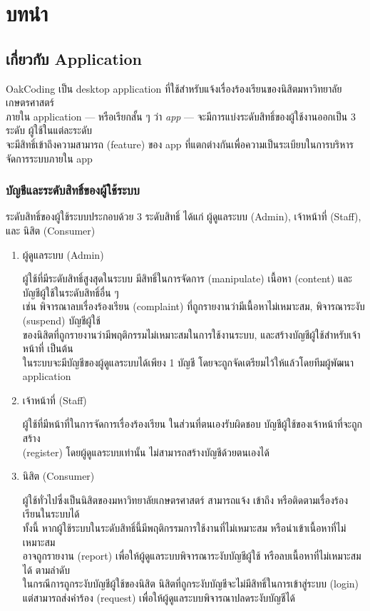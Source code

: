 \section*{บทนำ}

\subsection*{เกี่ยวกับ Application}

OakCoding เป็น desktop application ที่ใช้สำหรับแจ้งเรื่องร้องเรียนของนิสิตมหาวิทยาลัยเกษตรศาสตร์\\
ภายใน application --- หรือเรียกสั้น ๆ ว่า \textit{app} --- จะมีการแบ่งระดับสิทธิ์ของผู้ใช้งานออกเป็น 3 ระดับ ผู้ใช้ในแต่ละระดับ\\
จะมีสิทธิ์เข้าถึงความสามารถ (feature) ของ app ที่แตกต่างกันเพื่อความเป็นระเบียบในการบริหารจัดการระบบภายใน app

\subsubsection*{บัญชีและระดับสิทธิ์ของผู้ใช้ระบบ}
ระดับสิทธิ์ของผู้ใช้ระบบประกอบด้วย 3 ระดับสิทธิ์ ได้แก่ ผู้ดูแลระบบ (Admin), เจ้าหน้าที่ (Staff), และ นิสิต (Consumer)

\begin{enumerate}
    \item ผู้ดูแลระบบ (Admin)

        ผู้ใช้ที่มีระดับสิทธิ์สูงสุดในระบบ มีสิทธิ์ในการจัดการ (manipulate) เนื้อหา (content) และบัญชีผู้ใช้ในระดับสิทธิ์อื่น ๆ\\
        เช่น พิจารณาลบเรื่องร้องเรียน (complaint) ที่ถูกรายงานว่ามีเนื้อหาไม่เหมาะสม, พิจารณาระงับ (suspend) บัญชีผู้ใช้\\
        ของนิสิตที่ถูกรายงานว่ามีพฤติกรรมไม่เหมาะสมในการใช้งานระบบ, และสร้างบัญชีผู้ใช้สำหรับเจ้าหน้าที่ เป็นต้น\\
        ในระบบจะมีบัญชีของผู้ดูแลระบบได้เพียง 1 บัญชี โดยจะถูกจัดเตรียมไว้ให้แล้วโดยทีมผู้พัฒนา application
    \item เจ้าหน้าที่ (Staff)

        ผู้ใช้ที่มีหน้าที่ในการจัดการเรื่องร้องเรียน ในส่วนที่ตนเองรับผิดชอบ บัญชีผู้ใช้ของเจ้าหน้าที่จะถูกสร้าง\\
        (register) โดยผู้ดูแลระบบเท่านั้น ไม่สามารถสร้างบัญชีด้วยตนเองได้
    \item นิสิต (Consumer)

        ผู้ใช้ทั่วไปซึ่งเป็นนิสิตของมหาวิทยาลัยเกษตรศาสตร์ สามารถแจ้ง เข้าถึง หรือติดตามเรื่องร้องเรียนในระบบได้\\
        ทั้งนี้ หากผู้ใช้ระบบในระดับสิทธิ์นี้มีพฤติกรรมการใช้งานที่ไม่เหมาะสม หรือนำเข้าเนื้อหาที่ไม่เหมาะสม\\
        อาจถูกรายงาน (report) เพื่อให้ผู้ดูแลระบบพิจารณาระงับบัญชีผู้ใช้ หรือลบเนื้อหาที่ไม่เหมาะสมได้ ตามลำดับ\\
        ในกรณีการถูกระงับบัญชีผู้ใช้ของนิสิต นิสิตที่ถูกระงับบัญชีจะไม่มีสิทธิ์ในการเข้าสู่ระบบ (login)\\
        แต่สามารถส่งคำร้อง (request) เพื่อให้ผู้ดูแลระบบพิจารณาปลดระงับบัญชีได้
\end{enumerate}

